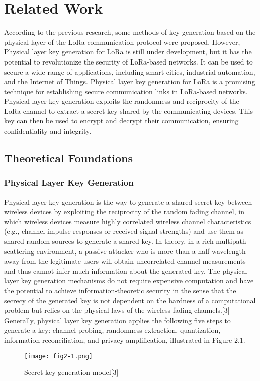 
\chapter{Related Work}
According to the previous research, some methods of key generation based on the physical layer of the LoRa communication protocol were proposed. However, Physical layer key generation for LoRa is still under development, but it has the potential to revolutionize the security of LoRa-based networks. It can be used to secure a wide range of applications, including smart cities, industrial automation, and the Internet of Things.
Physical layer key generation for LoRa is a promising technique for establishing secure communication links in LoRa-based networks. Physical layer key generation exploits the randomness and reciprocity of the LoRa channel to extract a secret key shared by the communicating devices. This key can then be used to encrypt and decrypt their communication, ensuring confidentiality and integrity.

\section{Theoretical Foundations}

\subsection{Physical Layer Key Generation}
Physical layer key generation is the way to generate a shared secret key between wireless devices by exploiting the reciprocity of the random fading channel, in which wireless devices measure highly correlated wireless channel characteristics (e.g., channel impulse responses or received signal strengths) and use them as shared random sources to generate a shared key. In theory, in a rich multipath scattering environment, a passive attacker who is more than a half-wavelength away from the legitimate users will obtain uncorrelated channel measurements and thus cannot infer much information about the generated key. The physical layer key generation mechanisms do not require expensive computation and have the potential to achieve information-theoretic security in the sense that the secrecy of the generated key is not dependent on the hardness of a computational problem but relies on the physical laws of the wireless fading channels.[3] 
Generally, physical layer key generation applies the following five steps to generate a key: channel probing, randomness extraction, quantization, information reconciliation, and privacy amplification, illustrated in Figure 2.1.
\begin{figure}
  \centering
  \texttt{[image: fig2-1.png]}
  \caption{Secret key generation model[3]}
  \label{fig:2-1}
\end{figure}

